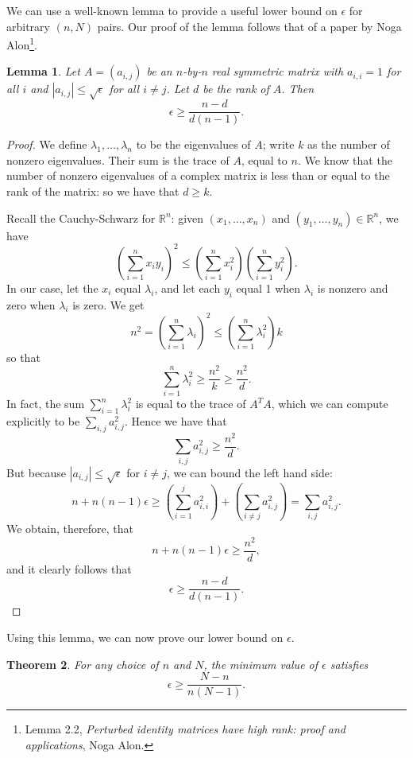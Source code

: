 \documentclass[11pt,letterpaper,twoside,english]{article}
\theoremstyle{theorem}
\newtheorem{theorem}{Theorem}[section]
\newtheorem{lemma}[theorem]{Lemma}
\theoremstyle{remark}
\begin{document}
We can use a well-known lemma to provide a useful lower bound on $\epsilon$ for arbitrary $(n, N)$ pairs. Our proof of the lemma follows that of a paper by Noga Alon\footnote{Lemma 2.2, \emph{Perturbed identity matrices have high rank: proof and applications}, Noga Alon.}.

\begin{lemma}
Let $A=(a_{i,j})$ be an $n$-by-$n$ real symmetric matrix with $a_{i,i}=1$ for all $i$ and $|a_{i,j}|\leq \sqrt{\epsilon}$ for all $i\neq j$. Let $d$ be the rank of $A$. Then
\[\epsilon\geq \frac{n-d}{d(n-1)}.\]
\end{lemma}
\begin{proof}
We define $\lambda_1,\ldots, \lambda_n$ to be the eigenvalues of $A$; write $k$ as the number of nonzero eigenvalues. Their sum is the trace of $A$, equal to $n$. We know that the number of nonzero eigenvalues of a complex matrix is less than or equal to the rank of the matrix: so we have that $d\geq k$.

Recall the Cauchy-Schwarz for $\mathbb R^n$: given $(x_1,\ldots, x_n)$ and $(y_1,\ldots, y_n)\in \mathbb R^n$, we have
\[\left(\sum_{i=1}^nx_iy_i\right)^2\leq \left(\sum_{i=1}^n x_i^2\right)\left(\sum_{i=1}^ny_i^2\right).\]
In our case, let the $x_i$ equal $\lambda_i$, and let each $y_i$ equal 1 when $\lambda_i$ is nonzero and zero when $\lambda_i$ is zero. We get
\[n^2=\left(\sum_{i=1}^n \lambda_i\right)^2\leq \left(\sum_{i=1}^n \lambda_i^2\right) k\]
so that
\[\sum_{i=1}^n \lambda_i^2\geq\frac{n^2}{k}\geq \frac{n^2}{d}.\]
In fact, the sum $\sum_{i=1}^n \lambda_i^2$ is equal to the trace of $A^TA$, which we can compute explicitly to be $\sum_{i,j}a_{i,j}^2$. Hence we have that
\[\sum_{i,j}a_{i,j}^2\geq \frac{n^2}{d}.\]
But because $|a_{i,j}|\leq \sqrt\epsilon$ for $i\neq j$, we can bound the left hand side:
\[n+n(n-1)\epsilon\geq \left(\sum_{i=1}^j a_{i,i}^2\right)+\left(\sum_{i\neq j}a_{i,j}^2\right)=\sum_{i,j}a_{i,j}^2.\]
We obtain, therefore, that
\[n+n(n-1)\epsilon\geq \frac{n^2}{d},\]
and it clearly follows that
\[\epsilon\geq \frac{n-d}{d(n-1)}.\]
\end{proof}
Using this lemma, we can now prove our lower bound on $\epsilon$.
\begin{theorem}
\label{lower_bound}
For any choice of $n$ and $N$, the minimum value of $\epsilon$ satisfies
\[\epsilon\geq \frac{N-n}{n(N-1)}.\]
\end{theorem}
\end{document}
